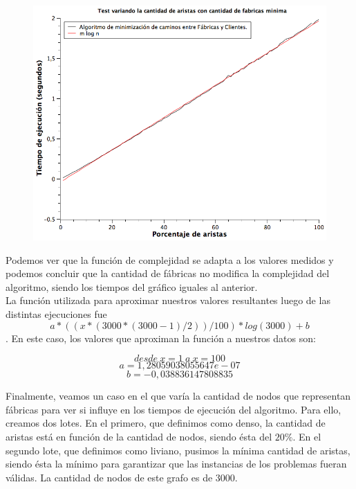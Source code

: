 \begin{figure}[H]
\begin{center}
	\includegraphics[width=350pt]{../tests/ej3/EJ3-r-var-liviano.png}
\end{center}
\end{figure}

Podemos ver que la función de complejidad se adapta a los valores medidos y podemos concluir que la cantidad de fábricas no modifica la complejidad del algoritmo, siendo los tiempos del gráfico iguales al anterior.\\
La función utilizada para aproximar nuestros valores resultantes luego de las distintas ejecuciones fue $$ a*((x*(3000*(3000-1)/2))/100)*log(3000)+b$$.
En este caso, los valores que aproximan la función a nuestros datos son:

$$desde\ x = 1\ a\ x = 100$$
$$a  = 1,28059038055647e-07$$
$$b  = -0,038836147808835$$

\newpage 
Finalmente, veamos un caso en el que varía la cantidad de nodos que representan fábricas para ver si influye en los tiempos de ejecución del algoritmo. Para ello, creamos dos lotes. En el primero, que definimos como denso, la cantidad de aristas está en función de la cantidad de nodos, siendo ésta del $20\%$. En el segundo lote, que definimos como liviano, pusimos la mínima cantidad de aristas, siendo ésta la mínimo para garantizar que las instancias de los problemas fueran válidas. La cantidad de nodos de este grafo es de $3000$.

